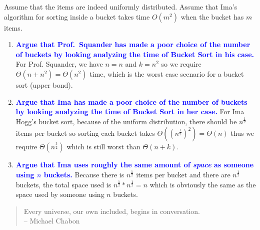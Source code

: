 \documentclass{article}
\begin{document}
\begin{enumerate}
{{Assume that the items are indeed uniformly distributed.  Assume that Ima's algorithm
for sorting inside a bucket takes time $O(m^2)$ when the bucket has $m$ items.}}
    \begin{enumerate}
    \item \textbf{\textcolor{blue}{Argue that Prof.\ Squander has made a poor choice of the number of buckets by
    looking analyzing the time of Bucket Sort in his case.}}
        \newline\newline For Prof. Squander, we have $n=n$ and $k=n^2$ so we require $\Theta(n + n^2)=\Theta(n^2)$ time, which is the worst case scenario for a bucket sort (upper bond).
    \item \textbf{\textcolor{blue}{Argue that Ima has made a poor choice of the number of buckets by looking analyzing the time of Bucket Sort in her case.}}
        \newline\newline For Ima Hogg's bucket sort, because of the uniform distribution, there should be $n^\frac{1}{2}$ items per bucket so sorting each bucket takes $\Theta((n^\frac{1}{2})^2)=\Theta(n)$ thus we require $\Theta(n^\frac{3}{2})$ which is still worst than $\Theta(n + k)$.
    \item \textbf{\textcolor{blue}{Argue that Ima uses roughly the same amount of {\em space} as someone
    using $n$ buckets.}}
        \newline\newline Because there is $n^\frac{1}{2}$ items per bucket and there are $n^{\frac{1}{2}}$ buckets, the total space used is $n^\frac{1}{2}*n^\frac{1}{2}=n$ which is obviously the same as the space used by someone using $n$ buckets.
    \end{enumerate}
\end{enumerate}

\begin{quote}
Every universe, our own included, begins in conversation.
\\ -- Michael Chabon
\end{quote}
\end{document}

